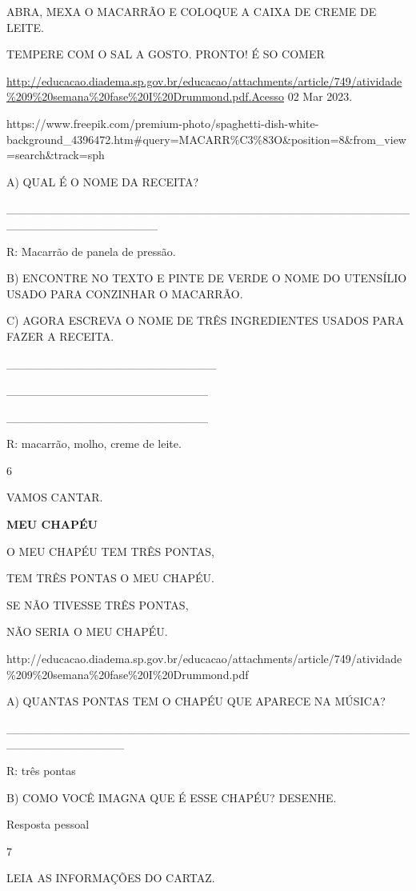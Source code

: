 {{{ABRA, MEXA O MACARRÃO E COLOQUE A CAIXA DE CREME DE LEITE.

TEMPERE COM O SAL A GOSTO. PRONTO! É SO COMER

\url{http://educacao.diadema.sp.gov.br/educacao/attachments/article/749/atividade\%209\%20semana\%20fase\%20I\%20Drummond.pdf.Acesso}
02 Mar 2023.

https://www.freepik.com/premium-photo/spaghetti-dish-white-background\_4396472.htm\#query=MACARR\%C3\%83O\&position=8\&from\_view=search\&track=sph

A) QUAL É O NOME DA RECEITA?

\_\_\_\_\_\_\_\_\_\_\_\_\_\_\_\_\_\_\_\_\_\_\_\_\_\_\_\_\_\_\_\_\_\_\_\_\_\_\_\_\_\_\_\_\_\_\_\_\_\_\_\_\_\_\_\_\_\_\_\_\_\_\_\_\_\_

R: Macarrão de panela de pressão.

B) ENCONTRE NO TEXTO E PINTE DE VERDE O NOME DO UTENSÍLIO USADO PARA
CONZINHAR O MACARRÃO.

C) AGORA ESCREVA O NOME DE TRÊS INGREDIENTES USADOS PARA FAZER A
RECEITA.

\_\_\_\_\_\_\_\_\_\_\_\_\_\_\_\_\_\_\_\_\_\_\_\_\_

\_\_\_\_\_\_\_\_\_\_\_\_\_\_\_\_\_\_\_\_\_\_\_\_

\_\_\_\_\_\_\_\_\_\_\_\_\_\_\_\_\_\_\_\_\_\_\_\_

R: macarrão, molho, creme de leite.

\num{6}

VAMOS CANTAR.

\textbf{MEU CHAPÉU}

O MEU CHAPÉU TEM TRÊS PONTAS,

TEM TRÊS PONTAS O MEU CHAPÉU.

SE NÃO TIVESSE TRÊS PONTAS,

NÃO SERIA O MEU CHAPÉU.

http://educacao.diadema.sp.gov.br/educacao/attachments/article/749/atividade\%209\%20semana\%20fase\%20I\%20Drummond.pdf

A) QUANTAS PONTAS TEM O CHAPÉU QUE APARECE NA MÚSICA?

\_\_\_\_\_\_\_\_\_\_\_\_\_\_\_\_\_\_\_\_\_\_\_\_\_\_\_\_\_\_\_\_\_\_\_\_\_\_\_\_\_\_\_\_\_\_\_\_\_\_\_\_\_\_\_\_\_\_\_\_\_\_

R: três pontas

B) COMO VOCÊ IMAGNA QUE É ESSE CHAPÉU? DESENHE.

Resposta pessoal

\num{7}

LEIA AS INFORMAÇÕES DO CARTAZ.

}}}
